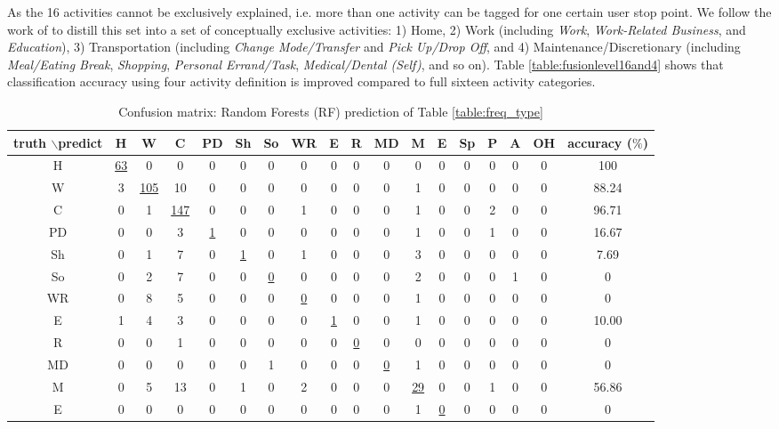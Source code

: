 \documentclass{sig-alternate}
\begin{document}
As the 16 activities cannot be exclusively explained, i.e. more than one activity can be tagged for one certain user stop point. We follow the work of  \cite{Kulkarni2000Microsimulation, Recker1985Travel} to distill this set into a set of conceptually exclusive activities: 1) Home, 2) Work (including \textit{Work}, \textit{Work-Related Business}, and \textit{Education}), 3) Transportation (including \textit{Change Mode/Transfer} and \textit{Pick Up/Drop Off}, and 4) Maintenance/Discretionary (including \textit{Meal/Eating Break}, \textit{Shopping}, \textit{Personal Errand/Task},  \textit{Medical/Dental (Self)}, and so on). Table \ref{table:fusionlevel16and4} shows that classification accuracy using four activity definition is improved compared to full sixteen activity categories.

\begin{table*}[ htb]
\tiny
\caption{Confusion matrix: Random Forests (RF) prediction of Table \ref{table:freq_type} }\label{table:confusion}
\centering
 \begin{tabular}{c| c c c c c c c c c c c c c c c c c }
\toprule
truth $\backslash$predict  & H   & W  & C & PD & Sh &So & WR & E & R & MD & M & E & Sp & P & A & OH   &accuracy ($\%$)  \\
\hline
 H   &\underline{63}	&0	&0&	0&	0&	0&	0&	0&	0&	0&	0	&0	&0	&0	&0	&0	&100\\
W	&3	&\underline{105}&10&	0&	0&	0&	0&	0&	0&	0	&1	&0	&0	&0	&0	&0	&88.24\\
C	&0	&1	&\underline{147}&	0&	0&	0&	1&	0&	0&	0&	1	&0	&0	&2	&0	&0	& 96.71\\
PD	&0	&0	&3&	\underline{1}&	0&	0&	0&	0&	0&	0&	1	&0	&0	&1	&0	&0	& 16.67\\
Sh	&0	&1	&7&	0&	\underline{1}&	0&	1&	0&	0&	0&	3	&0	&0	&0	&0	&0	& 7.69\\
So	&0	&2	&7&	0&	0&	\underline{0}&	0&	0&	0&	0&	2	&0	&0	&0	&1	&0	&0\\
WR	&0	&8	&5&	0&	0&	0&	\underline{0}&	0&	0&	0&	1	&0	&0	&0	&0	&0	&0\\
E	&1	&4	&3&	0&	0&	0&	0&	\underline{1}&	0&	0&	1	&0	&0	&0	&0	&0	& 10.00\\
R	&0	&0	&1&	0&	0&	0&	0&	0&	\underline{0}&	0&	0	&0	&0	&0	&0	&0	&0\\
MD	&0	&0	&0&	0&	0&	1&	0&	0&	0&	\underline{0}&	1	&0	&0	&0	&0	&0	&0\\
M	&0	&5	&13	&0	&1	&0	&2	&0	&0	&0	&\underline{29}	&0	&0	&1	&0	&0	& 56.86\\
E	&0	&0	&0&	0&	0&	0&	0&	0&	0&	0&	1	&\underline{0}	&0	&0	&0	&0	&0\\

\end{tabular}
\end{table*}
\end{document}
